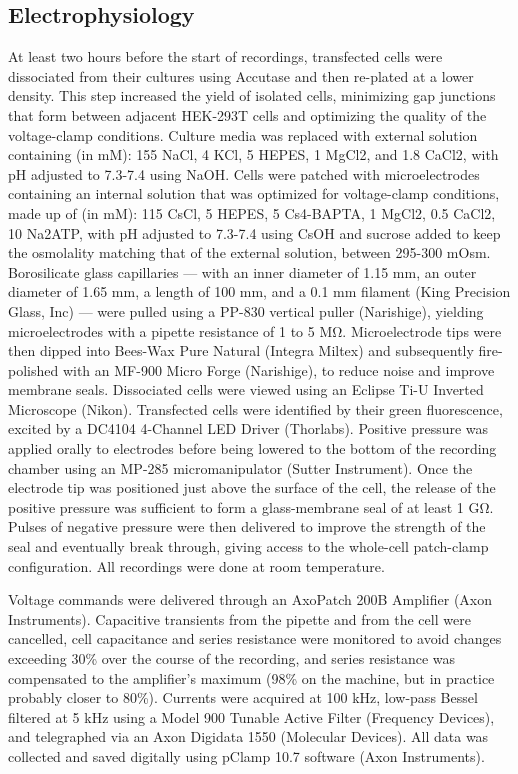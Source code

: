 \subsection{Electrophysiology}
At least two hours before the start of recordings, transfected cells were dissociated from their cultures using Accutase and then re-plated at a lower density. This step increased the yield of isolated cells, minimizing gap junctions that form between adjacent HEK-293T cells and optimizing the quality of the voltage-clamp conditions. Culture media was replaced with external solution containing (in mM): 155 NaCl, 4 KCl, 5 HEPES, 1 MgCl2, and 1.8 CaCl2, with pH adjusted to 7.3-7.4 using NaOH. Cells were patched with microelectrodes containing an internal solution that was optimized for voltage-clamp conditions, made up of (in mM): 115 CsCl, 5 HEPES, 5 Cs4-BAPTA, 1 MgCl2, 0.5 CaCl2, 10 Na2ATP, with pH adjusted to 7.3-7.4 using CsOH and sucrose added to keep the osmolality matching that of the external solution, between 295-300 mOsm. Borosilicate glass capillaries --- with an inner diameter of 1.15 mm, an outer diameter of 1.65 mm, a length of 100 mm, and a 0.1 mm filament (King Precision Glass, Inc) --- were pulled using a PP-830 vertical puller (Narishige), yielding microelectrodes with a pipette resistance of 1 to 5 MΩ. Microelectrode tips were then dipped into Bees-Wax Pure Natural (Integra Miltex) and subsequently fire-polished with an MF-900 Micro Forge (Narishige), to reduce noise and improve membrane seals. Dissociated cells were viewed using an Eclipse Ti-U Inverted Microscope (Nikon). Transfected cells were identified by their green fluorescence, excited by a DC4104 4-Channel LED Driver (Thorlabs). Positive pressure was applied orally to electrodes before being lowered to the bottom of the recording chamber using an MP-285 micromanipulator (Sutter Instrument). Once the electrode tip was positioned just above the surface of the cell, the release of the positive pressure was sufficient to form a glass-membrane seal of at least 1 GΩ. Pulses of negative pressure were then delivered to improve the strength of the seal and eventually break through, giving access to the whole-cell patch-clamp configuration. All recordings were done at room temperature.

Voltage commands were delivered through an AxoPatch 200B Amplifier (Axon Instruments). Capacitive transients from the pipette and from the cell were cancelled, cell capacitance and series resistance were monitored to avoid changes exceeding 30\% over the course of the recording, and series resistance was compensated to the amplifier’s maximum (98\% on the machine, but in practice probably closer to 80\%). Currents were acquired at 100 kHz, low-pass Bessel filtered at 5 kHz using a Model 900 Tunable Active Filter (Frequency Devices), and telegraphed via an Axon Digidata 1550 (Molecular Devices). All data was collected and saved digitally using pClamp 10.7 software (Axon Instruments).

